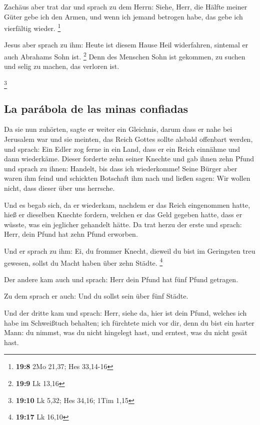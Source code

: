  Zachäus aber trat dar und sprach zu dem Herrn: Siehe,
Herr, die Hälfte meiner Güter gebe ich den Armen, und wenn ich jemand
betrogen habe, das gebe ich vierfältig wieder. \footnote{\textbf{19:8}
  2Mo 21,37; Hes 33,14-16}

 Jesus aber sprach zu ihm: Heute ist diesem Hause Heil
widerfahren, sintemal er auch Abrahams Sohn ist. \footnote{\textbf{19:9}
  Lk 13,16}  Denn des Menschen Sohn ist gekommen, zu
suchen und selig zu machen, das verloren ist.

\footnote{\textbf{19:10} Lk 5,32; Hes 34,16; 1Tim 1,15}

\hypertarget{la-paruxe1bola-de-las-minas-confiadas}{%
\subsection{La parábola de las minas
confiadas}\label{la-paruxe1bola-de-las-minas-confiadas}}

 Da sie nun zuhörten, sagte er weiter ein Gleichnis,
darum dass er nahe bei Jerusalem war und sie meinten, das Reich Gottes
sollte alsbald offenbart werden,  und sprach: Ein Edler
zog ferne in ein Land, dass er ein Reich einnähme und dann wiederkäme.
 Dieser forderte zehn seiner Knechte und gab ihnen zehn
Pfund und sprach zu ihnen: Handelt, bis dass ich wiederkomme!
 Seine Bürger aber waren ihm feind und schickten
Botschaft ihm nach und ließen sagen: Wir wollen nicht, dass dieser über
uns herrsche.

 Und es begab sich, da er wiederkam, nachdem er das Reich
eingenommen hatte, hieß er dieselben Knechte fordern, welchen er das
Geld gegeben hatte, dass er wüsste, was ein jeglicher gehandelt hätte.
 Da trat herzu der erste und sprach: Herr, dein Pfund hat
zehn Pfund erworben.

 Und er sprach zu ihm: Ei, du frommer Knecht, dieweil du
bist im Geringsten treu gewesen, sollst du Macht haben über zehn Städte.
\footnote{\textbf{19:17} Lk 16,10}

 Der andere kam auch und sprach: Herr dein Pfund hat fünf
Pfund getragen.

 Zu dem sprach er auch: Und du sollst sein über fünf
Städte.

 Und der dritte kam und sprach: Herr, siehe da, hier ist
dein Pfund, welches ich habe im Schweißtuch behalten; 
ich fürchtete mich vor dir, denn du bist ein harter Mann: du nimmst, was
du nicht hingelegt hast, und erntest, was du nicht gesät hast.

